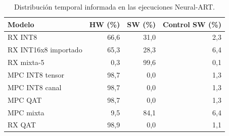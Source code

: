 \begin{table}[H]
\centering\small
\caption{Distribución temporal informada en las ejecuciones Neural-ART.}\label{tab:perfil}
\begin{tabularx}{\linewidth}{Yrrr}\toprule
Modelo & HW (\%) & SW (\%) & Control SW (\%)\\\midrule
RX INT8 & 66,6 & 31,0 & 2,3\\
RX INT16x8 importado & 65,3 & 28,3 & 6,4\\
RX mixta-5 & 0,3 & 99,6 & 0,1\\
MPC INT8 tensor & 98,7 & 0,0 & 1,3\\
MPC INT8 canal & 98,7 & 0,0 & 1,3\\
MPC QAT & 98,7 & 0,0 & 1,3\\
MPC mixta & 9,5 & 84,1 & 6,4\\
RX QAT & 98,9 & 0,0 & 1,1\\
\bottomrule\end{tabularx}
\end{table}
